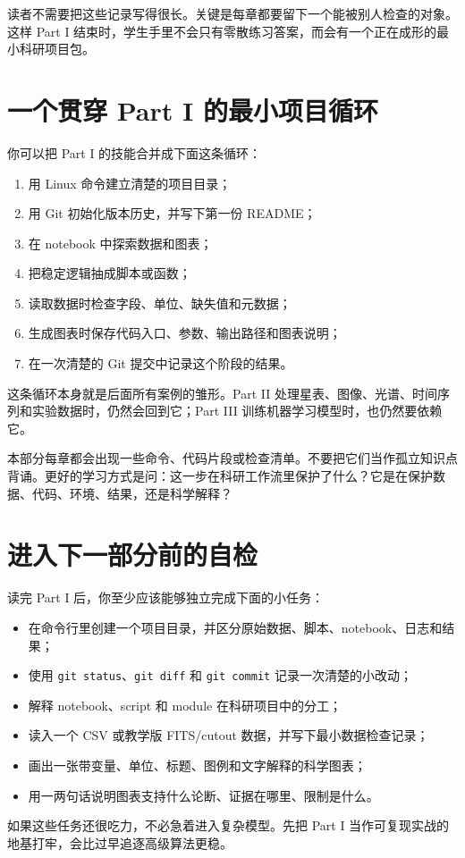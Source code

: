 读者不需要把这些记录写得很长。关键是每章都要留下一个能被别人检查的对象。这样 Part I 结束时，学生手里不会只有零散练习答案，而会有一个正在成形的最小科研项目包。

\section*{一个贯穿 Part I 的最小项目循环}

你可以把 Part I 的技能合并成下面这条循环：

\begin{enumerate}
    \item 用 Linux 命令建立清楚的项目目录；
    \item 用 Git 初始化版本历史，并写下第一份 README；
    \item 在 notebook 中探索数据和图表；
    \item 把稳定逻辑抽成脚本或函数；
    \item 读取数据时检查字段、单位、缺失值和元数据；
    \item 生成图表时保存代码入口、参数、输出路径和图表说明；
    \item 在一次清楚的 Git 提交中记录这个阶段的结果。
\end{enumerate}

这条循环本身就是后面所有案例的雏形。Part II 处理星表、图像、光谱、时间序列和实验数据时，仍然会回到它；Part III 训练机器学习模型时，也仍然要依赖它。

\begin{protip}
本部分每章都会出现一些命令、代码片段或检查清单。不要把它们当作孤立知识点背诵。更好的学习方式是问：这一步在科研工作流里保护了什么？它是在保护数据、代码、环境、结果，还是科学解释？
\end{protip}

\section*{进入下一部分前的自检}

读完 Part I 后，你至少应该能够独立完成下面的小任务：

\begin{itemize}
    \item 在命令行里创建一个项目目录，并区分原始数据、脚本、notebook、日志和结果；
    \item 使用 \texttt{git status}、\texttt{git diff} 和 \texttt{git commit} 记录一次清楚的小改动；
    \item 解释 notebook、script 和 module 在科研项目中的分工；
    \item 读入一个 CSV 或教学版 FITS/cutout 数据，并写下最小数据检查记录；
    \item 画出一张带变量、单位、标题、图例和文字解释的科学图表；
    \item 用一两句话说明图表支持什么论断、证据在哪里、限制是什么。
\end{itemize}

如果这些任务还很吃力，不必急着进入复杂模型。先把 Part I 当作可复现实战的地基打牢，会比过早追逐高级算法更稳。
